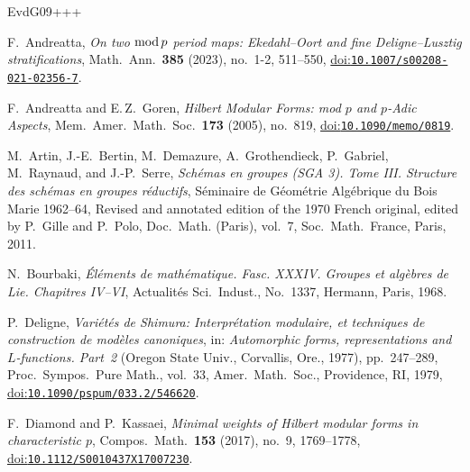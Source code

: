 \documentclass[10pt,a4paper]{article}
\numberwithin{equation}{section}
\newcommand{\doi}[1]{\href{https://doi.org/#1}{doi:\nolinkurl{#1}}}
\theoremstyle{definition}
\theoremstyle{remark}
\begin{document}
\newcommand{\etalchar}[1]{$^{#1}$}
\providecommand{\bysame}{\leavevmode\hbox to3em{\hrulefill}\thinspace}

\begin{thebibliography}{EvdG09+++}

F.~Andreatta, \emph{On two {${\rm mod}\,p$} period maps: {E}kedahl--{O}ort and
  fine {D}eligne--{L}usztig stratifications}, Math.\ Ann.\ \textbf{385} (2023),
no.~1-2, 511--550, \doi{10.1007/s00208-021-02356-7}.

F.~Andreatta and E.\,Z.~Goren, \emph{Hilbert Modular Forms: mod $p$ and $p$-Adic
  Aspects}, Mem.\ Amer.\ Math.\ Soc.\ \textbf{173} (2005), no.~819, 
\doi{10.1090/memo/0819}.

  
\bibitem[ABD{\etalchar{+}}11]{SGA3}
M.~Artin, J.-E.~Bertin, M.~Demazure, A.~Grothendieck, P.~Gabriel, M.~Raynaud, and J.-P.~Serre,  \emph{Sch\'emas en groupes (SGA 3). Tome III. Structure des sch\'emas en groupes r\'eductifs}, S\'eminaire de G\'eom\'etrie Alg\'ebrique du Bois Marie 1962--64, Revised and annotated edition of the 1970 French original, edited by P.~Gille and P.~Polo, Doc.\ Math. (Paris), vol.~7, Soc.\ Math.\ France,
Paris, 2011.

  N.~Bourbaki, \emph{\'El\'ements de math\'ematique. Fasc. XXXIV. Groupes et alg\`ebres de Lie. Chapitres IV--VI}, Actualit\'es Sci.\ Indust., No.~1337, Hermann, Paris, 1968. 


P.~Deligne, \emph{Vari\'et\'es de {S}himura: {I}nterpr\'etation modulaire, et
  techniques de construction de mod\`eles canoniques}, in: \emph{Automorphic forms,  representations and {$L$}-functions. Part~2} ({O}regon {S}tate {U}niv., {C}orvallis, Ore., 1977), pp.~247--289, {P}roc.\ {S}ympos.\ {P}ure {M}ath., vol.~33, Amer.\ Math.\ Soc., Providence, RI,
  1979, \doi{10.1090/pspum/033.2/546620}.

F.~Diamond and P.~Kassaei, \emph{Minimal weights of {H}ilbert modular forms in
  characteristic {$p$}}, Compos.\ Math.\ \textbf{153} (2017), no.~9, 1769--1778,
\doi{10.1112/S0010437X17007230}.


\end{thebibliography}
\end{document}
